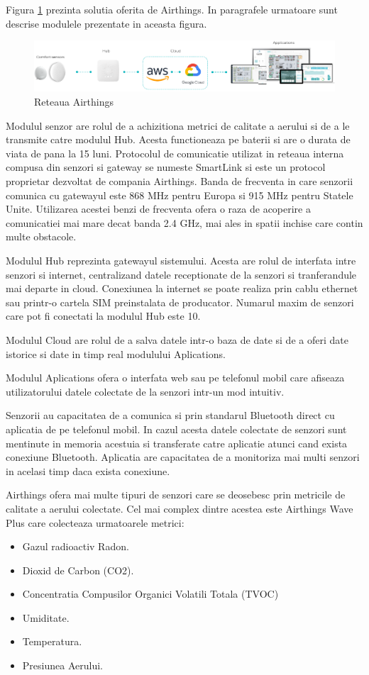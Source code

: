 Figura \ref{fig:sb_airthingsNetwork} prezinta solutia oferita de Airthings. In paragrafele urmatoare sunt descrise modulele prezentate in aceasta figura.
\begin{figure}[H]
    \centering
    \includegraphics[scale=0.6]{figs/sb_airthingsNetwork.png}
    \caption{Reteaua Airthings}
    \label{fig:sb_airthingsNetwork}
\end{figure}

Modulul senzor are rolul de a achizitiona metrici de calitate a aerului si de a le transmite catre modulul Hub. Acesta functioneaza pe baterii si are o durata de 
viata de pana la 15 luni. Protocolul de comunicatie utilizat in reteaua interna compusa din senzori si gateway se numeste SmartLink si este un protocol proprietar 
dezvoltat de compania Airthings. Banda de frecventa in care senzorii comunica cu gatewayul este 868 MHz pentru Europa si 915 MHz pentru Statele Unite. Utilizarea 
acestei benzi de frecventa ofera o raza de acoperire a comunicatiei mai mare decat banda 2.4 GHz, mai ales in spatii inchise care contin multe obstacole.

Modulul Hub reprezinta gatewayul sistemului. Acesta are rolul de interfata intre senzori si internet, centralizand datele receptionate de la senzori si tranferandule 
mai departe in cloud. Conexiunea la internet se poate realiza prin cablu ethernet sau printr-o cartela SIM preinstalata de producator. Numarul maxim de senzori care 
pot fi conectati la modulul Hub este 10.

Modulul Cloud are rolul de a salva datele intr-o baza de date si de a oferi date istorice si date in timp real modulului Aplications.

Modulul Aplications ofera o interfata web sau pe telefonul mobil care afiseaza utilizatorului datele colectate de la senzori intr-un mod intuitiv.

Senzorii au capacitatea de a comunica si prin standarul Bluetooth direct cu aplicatia de pe telefonul mobil. In cazul acesta datele colectate de senzori sunt 
mentinute in memoria acestuia si transferate catre aplicatie atunci cand exista conexiune Bluetooth. Aplicatia are capacitatea de a monitoriza mai multi senzori 
in acelasi timp daca exista conexiune.

Airthings ofera mai multe tipuri de senzori care se deosebesc prin metricile de calitate a aerului colectate. Cel mai complex dintre acestea este Airthings Wave 
Plus care colecteaza urmatoarele metrici:
\begin{itemize}
	\item Gazul radioactiv Radon.
	\item Dioxid de Carbon (CO2).
	\item Concentratia Compusilor Organici Volatili Totala (TVOC)
	\item Umiditate.
	\item Temperatura.
	\item Presiunea Aerului.
\end{itemize}


